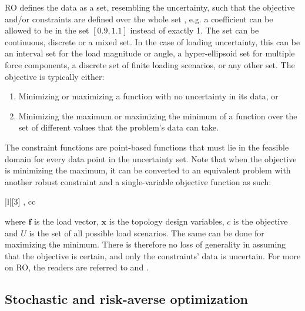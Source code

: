RO defines the data as a set, resembling the uncertainty, such that the objective and/or constraints are defined over the whole set \citep{Bertsimas2011}, e.g. a coefficient can be allowed to be in the set $[0.9, 1.1]$ instead of exactly 1. The set can be continuous, discrete or a mixed set. In the case of loading uncertainty, this can be an interval set for the load magnitude or angle, a hyper-ellipsoid set for multiple force components, a discrete set of finite loading scenarios, or any other set. The objective is typically either:
\begin{enumerate}
  \item Minimizing or maximizing a function with no uncertainty in its data, or
  \item Minimizing the maximum or maximizing the minimum of a function over the set of different values that the problem's data can take. 
\end{enumerate}
The constraint functions are point-based functions that must lie in the feasible domain for every data point in the uncertainty set. Note that when the objective is minimizing the maximum, it can be converted to an equivalent problem with another robust constraint and a single-variable objective function as such:
  \begin{mini!}|l|[3]
    {, c}{c}{}{}
  \end{mini!}
where $\bm{f}$ is the load vector, $\bm{x}$ is the topology design variables, $c$ is the objective and $U$ is the set of all possible load scenarios. The same can be done for maximizing the minimum. There is therefore no loss of generality in assuming that the objective is certain, and only the constraints' data is uncertain. For more on RO, the readers are referred to \cite{Bertsimas2011} and \cite{AharonBen-Tal2009}.

\subsection{Stochastic and risk-averse optimization}

